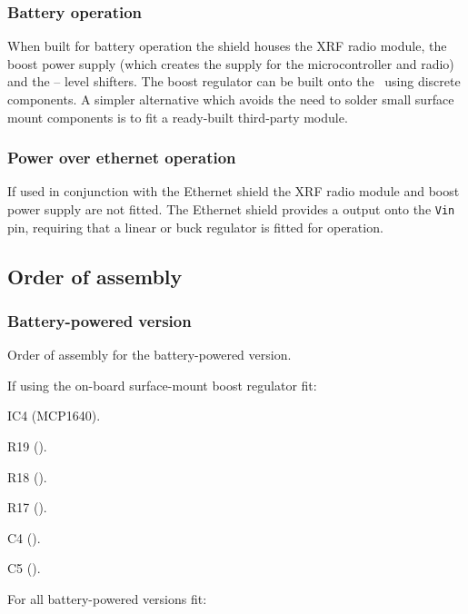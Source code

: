 \subsubsection{Battery operation}
When built for battery operation the shield houses the XRF radio
module, the boost power supply (which creates the  supply
for the microcontroller and radio) and the  -- 
level shifters. The boost regulator can be built onto the \pcb\ using
discrete components. A simpler alternative which avoids the need to
solder small surface mount components is to fit a ready-built
third-party module.


\subsubsection{Power over ethernet operation}
If used in conjunction with the Ethernet shield the
XRF radio module and boost power supply are not fitted. The Ethernet
shield provides a  output onto the \texttt{Vin} pin,
requiring that a linear or buck regulator is fitted for  operation.

\subsection{Order of assembly}
\subsubsection{Battery-powered version}


Order of assembly for the battery-powered version.

If using the on-board surface-mount boost regulator fit:
\begin{buildorder}
\item IC4 (MCP1640).
\item R19 ().
\item R18 ().
\item R17 ().
\item C4 ().
\item C5 ().
\end{buildorder}

For all battery-powered versions fit:


